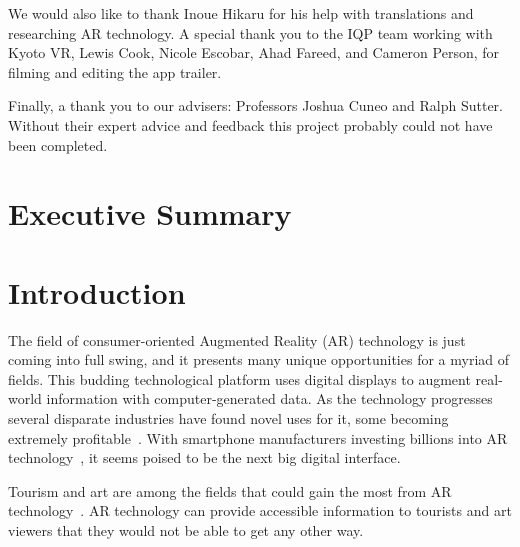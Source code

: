 \documentclass[a4paper, 10pt, american, titlepage]{article}
\begin{document}
We would also like to thank Inoue Hikaru for his help with translations and
researching AR technology. A special thank you to the IQP team working with
Kyoto VR, Lewis Cook, Nicole Escobar, Ahad Fareed, and Cameron Person, for
filming and editing the app trailer.

Finally, a thank you to our advisers: Professors Joshua Cuneo and Ralph Sutter.
Without their expert advice and feedback this project probably could not have
been completed.

\clearpage

\section*{Executive Summary}
\label{sec:executiveSummary}


\clearpage

{
\linespread{1}

\tableofcontents
{}
\newpage

\listoffigures
{}
\newpage

}


\section{Introduction}
\label{sec:introduction}

The field of consumer-oriented Augmented Reality (AR) technology is just coming
into full swing, and it presents many unique opportunities for a myriad of
fields. This budding technological platform uses digital displays to augment
real-world information with computer-generated data. As the technology
progresses several disparate industries have found novel uses for it, some
becoming extremely profitable~\autocite{webster2018}. With smartphone
manufacturers investing billions into AR technology~\autocite{mason2016}, it
seems poised to be the next big digital interface.

Tourism and art are among the fields that could gain the most from AR
technology~\autocite{saenz2009, katz2018}. AR technology can provide accessible
information to tourists and art viewers that they would not be able to get any
other way.
\end{document}
